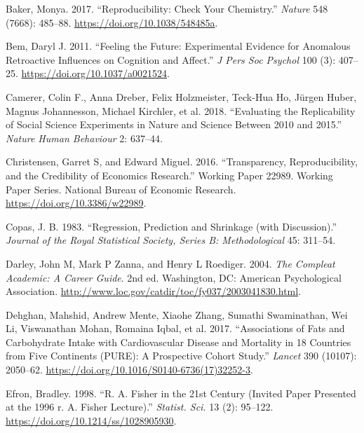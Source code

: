 \documentclass[
  12pt,
]{book}
\newlength{\cslhangindent}
\newlength{\cslentryspacingunit} %
\newenvironment{CSLReferences}[2] %
 {%
  \setlength{\parindent}{0pt}
  \ifodd #1
  \let\oldpar\par
  \def\par{\hangindent=\cslhangindent\oldpar}
  \fi
  \setlength{\parskip}{#2\cslentryspacingunit}
 }%
 {}
\begin{document}
\hypertarget{refs}{}
\begin{CSLReferences}{1}{0}
\leavevmode{}%
Baker, Monya. 2017. {``Reproducibility: Check Your Chemistry.''} \emph{Nature} 548 (7668): 485--88. \url{https://doi.org/10.1038/548485a}.

\leavevmode{}%
Bem, Daryl J. 2011. {``Feeling the Future: Experimental Evidence for Anomalous Retroactive Influences on Cognition and Affect.''} \emph{J Pers Soc Psychol} 100 (3): 407--25. \url{https://doi.org/10.1037/a0021524}.

\leavevmode{}%
Camerer, Colin F., Anna Dreber, Felix Holzmeister, Teck-Hua Ho, Jürgen Huber, Magnus Johannesson, Michael Kirchler, et al. 2018. {``Evaluating the Replicability of Social Science Experiments in Nature and Science Between 2010 and 2015.''} \emph{Nature Human Behaviour} 2: 637--44.

\leavevmode{}%
Christensen, Garret S, and Edward Miguel. 2016. {``Transparency, Reproducibility, and the Credibility of Economics Research.''} Working Paper 22989. Working Paper Series. National Bureau of Economic Research. \url{https://doi.org/10.3386/w22989}.

\leavevmode{}%
Copas, J. B. 1983. {``Regression, Prediction and Shrinkage (with Discussion).''} \emph{Journal of the Royal Statistical Society, Series B: Methodological} 45: 311--54.

\leavevmode{}%
Darley, John M, Mark P Zanna, and Henry L Roediger. 2004. \emph{The Compleat Academic: A Career Guide}. 2nd ed. Washington, DC: American Psychological Association. \url{http://www.loc.gov/catdir/toc/fy037/2003041830.html}.

\leavevmode{}%
Dehghan, Mahshid, Andrew Mente, Xiaohe Zhang, Sumathi Swaminathan, Wei Li, Viswanathan Mohan, Romaina Iqbal, et al. 2017. {``Associations of Fats and Carbohydrate Intake with Cardiovascular Disease and Mortality in 18 Countries from Five Continents (PURE): A Prospective Cohort Study.''} \emph{Lancet} 390 (10107): 2050--62. \url{https://doi.org/10.1016/S0140-6736(17)32252-3}.

\leavevmode{}%
Efron, Bradley. 1998. {``R. A. Fisher in the 21st Century (Invited Paper Presented at the 1996 r. A. Fisher Lecture).''} \emph{Statist. Sci.} 13 (2): 95--122. \url{https://doi.org/10.1214/ss/1028905930}.


\end{CSLReferences}
\end{document}
